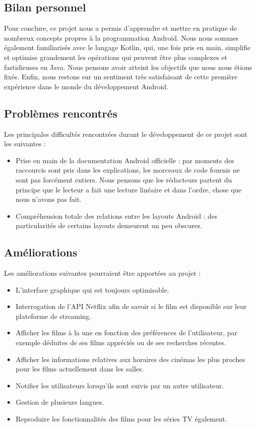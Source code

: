 \subsection{Bilan personnel}
Pour conclure, ce projet nous a permis d'apprendre et mettre en pratique de nombreux concepts propres à la programmation Android. Nous nous sommes également familiarisés avec le langage Kotlin, qui, une fois pris en main, simplifie et optimise grandement les opérations qui peuvent être plus complexes et fastidieuses en Java. Nous pensons avoir atteint les objectifs que nous nous étions fixés. Enfin, nous restons sur un sentiment très satisfaisant de cette première expérience dans le monde du développement Android.

\subsection{Problèmes rencontrés}
Les principales difficultés rencontrées durant le développement de ce projet sont les suivantes :
\begin{itemize}
    \item Prise en main de la documentation Android officielle : par moments des raccourcis sont pris dans les explications, les morceaux de code fournis ne sont pas forcément entiers. Nous pensons que les rédacteurs partent du principe que le lecteur a fait une lecture linéaire et dans l'ordre, chose que nous n'avons pas fait.
    \item Compréhension totale des relations entre les layouts Android : des particularités de certains layouts demeurent un peu obscures.
\end{itemize}

\subsection{Améliorations}
Les améliorations suivantes pourraient être apportées au projet :
\begin{itemize}
    \item L'interface graphique qui est toujours optimisable.
    \item Interrogation de l'API Netflix afin de savoir si le film est disponible sur leur plateforme de streaming.
    \item Afficher les films à la une en fonction des préférences de l'utilisateur, par exemple déduites de ses films appréciés ou de ses recherches récentes.
    \item Afficher les informations relatives aux horaires des cinémas les plus proches pour les films actuellement dans les salles.
    \item Notifier les utilisateurs lorsqu'ils sont suivis par un autre utilisateur.
    \item Gestion de plusieurs langues.
    \item Reproduire les fonctionnalités des films pour les séries TV également.
\end{itemize}
